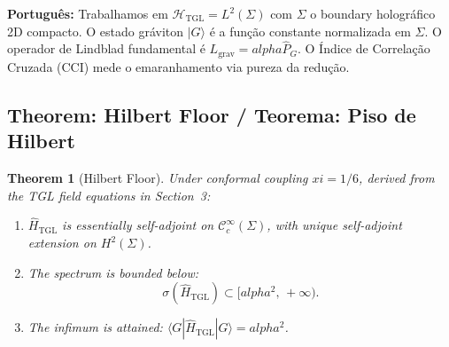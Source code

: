 \documentclass[12pt,a4paper]{article}
\newtheorem{theorem}{Theorem}
\def\alpha{alpha}%
\def\xi{xi}%
\begin{document}
\textbf{Português:} Trabalhamos em $\mathcal{H}_{\text{TGL}} = L^2(\Sigma)$ com $\Sigma$ o boundary holográfico 2D compacto. O estado gráviton $|G\rangle$ é a função constante normalizada em $\Sigma$. O operador de Lindblad fundamental é $L_{\text{grav}} = \alpha\hat{P}_G$. O Índice de Correlação Cruzada (CCI) mede o emaranhamento via pureza da redução.

\subsection{Theorem: Hilbert Floor / Teorema: Piso de Hilbert}

\begin{theorem}[Hilbert Floor]
\label{thm:floor}
Under conformal coupling $\xi = 1/6$, derived from the TGL field equations in Section~3:
\begin{enumerate}
    \item[\textbf{(T1)}] $\hat{H}_{\text{TGL}}$ is essentially self-adjoint on $\mathcal{C}_c^\infty(\Sigma)$, with unique self-adjoint extension on $H^2(\Sigma)$.
    \item[\textbf{(T2)}] The spectrum is bounded below:
    \begin{equation}
        \sigma(\hat{H}_{\text{TGL}}) \subset [\alpha^2,\,+\infty).
    \end{equation}
    \item[\textbf{(T3)}] The infimum is attained: $\langle G|\hat{H}_{\text{TGL}}|G\rangle = \alpha^2$.
\end{enumerate}
\end{theorem}
\end{document}
